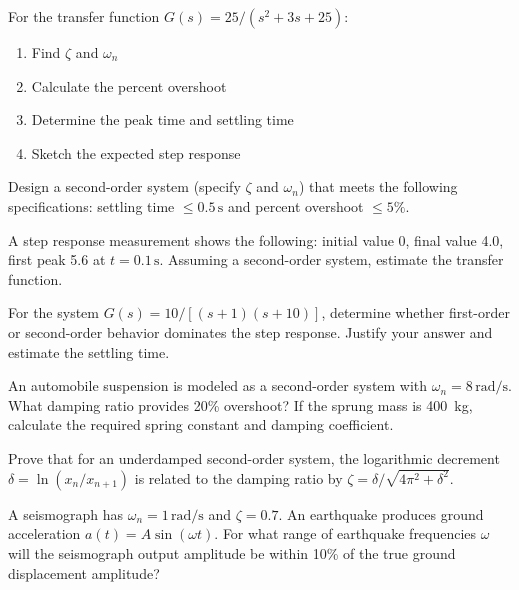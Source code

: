 \begin{exercise}
For the transfer function $G(s) = 25/(s^2 + 3s + 25)$:
\begin{enumerate}[label=(\alph*)]
    \item Find $\zeta$ and $\omega_n$
    \item Calculate the percent overshoot
    \item Determine the peak time and settling time
    \item Sketch the expected step response
\end{enumerate}
\end{exercise}

\begin{exercise}
Design a second-order system (specify $\zeta$ and $\omega_n$) that meets the following specifications: settling time $\leq 0.5\,\text{s}$ and percent overshoot $\leq 5\%$.
\end{exercise}

\begin{exercise}
A step response measurement shows the following: initial value 0, final value 4.0, first peak 5.6 at $t = 0.1\,\text{s}$. Assuming a second-order system, estimate the transfer function.
\end{exercise}

\begin{exercise}
For the system $G(s) = 10/[(s+1)(s+10)]$, determine whether first-order or second-order behavior dominates the step response. Justify your answer and estimate the settling time.
\end{exercise}

\begin{exercise}
An automobile suspension is modeled as a second-order system with $\omega_n = 8\,\text{rad/s}$. What damping ratio provides 20\% overshoot? If the sprung mass is 400~kg, calculate the required spring constant and damping coefficient.
\end{exercise}

\begin{exercise}
Prove that for an underdamped second-order system, the logarithmic decrement $\delta = \ln(x_n/x_{n+1})$ is related to the damping ratio by $\zeta = \delta/\sqrt{4\pi^2 + \delta^2}$.
\end{exercise}

\begin{exercise}
A seismograph has $\omega_n = 1\,\text{rad/s}$ and $\zeta = 0.7$. An earthquake produces ground acceleration $a(t) = A\sin(\omega t)$. For what range of earthquake frequencies $\omega$ will the seismograph output amplitude be within 10\% of the true ground displacement amplitude?
\end{exercise}

